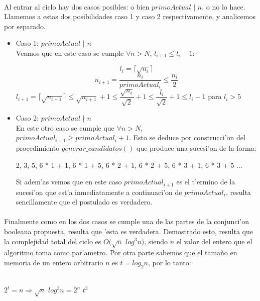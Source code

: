\paragraph{}
Al entrar al ciclo hay dos casos posibles: o bien $primoActual$ $|$ $n$, o no lo hace. Llamemos a estas dos
posibilidades caso 1 y caso 2 respectivamente, y analicemos por separado.
\begin{itemize}
\item Caso 1: $primoActual$ $|$ $n$ \\
Veamos que en este caso se cumple $\forall n > N$, $l_{i+1} \leq l_i - 1$:
\begin{center}
$$l_i = \lceil \sqrt{n_i}\rceil$$
$$n_{i+1} =  \dfrac{n_i}{primoActual_i} \leq \dfrac {n_i}{2}$$
$l_{i+1} = \lceil \sqrt{n_{i+1}} \rceil \leq \sqrt{n_{i+1}} + 1 \leq \dfrac {\sqrt{n_i}}{\sqrt{2}} + 1
  \leq \dfrac {l_i} {\sqrt{2}} + 1 \leq l_i - 1$ para $l_i > 5$
\end{center}
\item Caso 2: $primoActual \nmid n$\\
En este otro caso se cumple que $\forall n > N$, $primoActual_{i+1} \geq primoActual_i + 1$. Esto se deduce
por construcci'on del procedimiento $generar\_candidatos()$ que produce una sucesi'on de la forma: \\

\centerline{2, 3, 5, 6 * 1 + 1, 6 * 1 + 5, 6 * 2 + 1, 6 * 2 + 5, 6 * 3 + 1, 6 * 3 + 5 ...} 

Si adem'as vemos que en este caso $primoActual_{i+1}$ es el t'ermino de la sucesi'on que est'a 
inmediatamente a continuaci'on de $primoActual_i$, resulta sencillamente que el postulado es verdadero.
\end{itemize}

\paragraph{}
Finalmente como en los dos casos se cumple una de las partes de la conjunci'on booleana propuesta,
resulta que 'esta es verdadera. Demostrado esto, resulta que la complejidad total del ciclo es 
$O(\sqrt{n}$ $log^3 n)$, siendo $n$ el valor del entero que el algoritmo toma como par'ametro. 
Por otra parte sabemos que el tamaño en memoria de un entero arbitrario $n$ es $t = log_2 n$, por lo tanto:\\
\\
\centerline{$2^t = n \Rightarrow \sqrt{n}$ $log^3 n = 2^n$ $t^3$}


